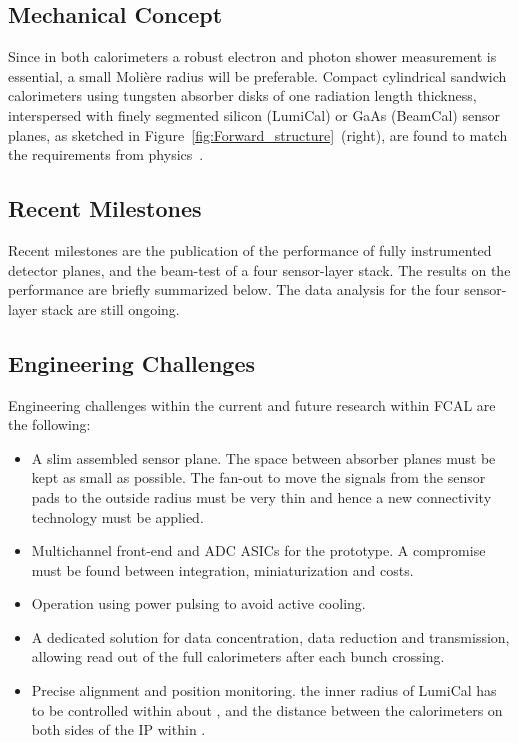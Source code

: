 \subsection{Mechanical Concept}
Since in both calorimeters a robust electron and photon shower measurement
is essential, a small Moli\`{e}re radius will be preferable.
Compact
cylindrical sandwich
calorimeters using tungsten absorber disks of one radiation length thickness, interspersed with
finely segmented silicon (LumiCal) or GaAs (BeamCal) sensor planes, as sketched in
Figure~\ref{fig:Forward_structure}~(right),
are found
to match the requirements from physics~\cite{2010JInst...512002A}.

\subsection{Recent Milestones}
Recent milestones are the publication of the performance of fully instrumented detector planes, and the beam-test of a four
sensor-layer stack. The results on the performance are briefly summarized below.
The data analysis for the four sensor-layer stack are still ongoing.

\subsection{Engineering Challenges}
Engineering challenges within the current and future research within FCAL are the following:
\begin{itemize}
\item{A slim assembled sensor plane. The space between absorber planes must be kept as small
as possible. The fan-out to move the signals from the sensor pads to the outside radius must be very thin and
hence a new connectivity technology must be applied.}
\item{Multichannel front-end and ADC ASICs for the prototype.
A compromise must be found between integration, miniaturization and costs}.
\item{Operation using power pulsing to avoid active cooling}.
\item{A dedicated solution for data concentration, data reduction and transmission, allowing read out of
the full calorimeters after each bunch crossing}.
\item{Precise alignment and position monitoring. the inner radius of LumiCal has to be controlled within about \unit[10]{\micron}, and the distance between the
calorimeters on both sides of the IP within \unit[100]{\micron}}.
\end{itemize}

